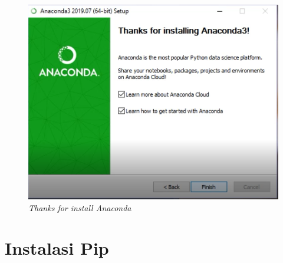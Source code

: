 \begin{enumerate}
\begin{figure}[H]
    \centering
    \includegraphics[scale=0.5]{figures/11}
    \caption{\textit{Thanks for install Anaconda}}
    \label{Figureanaconda70}
\end{figure}
\end{enumerate}

\section{Instalasi Pip}

